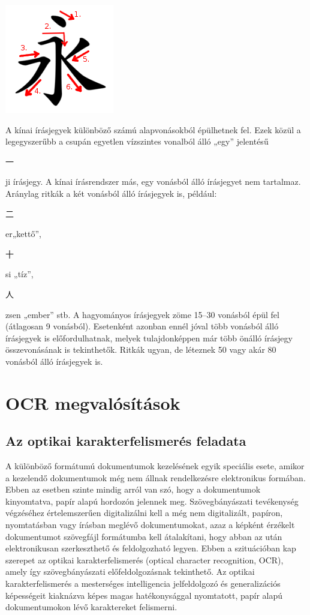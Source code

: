 \begin{center}
	\includegraphics[scale=1.0]{images/vonasrend_ordered.png}
\end{center}

A kínai írásjegyek különböző számú alapvonásokból épülhetnek fel. Ezek közül a legegyszerűbb a csupán egyetlen vízszintes vonalból álló „egy” jelentésű \begin{CJK*}{UTF8}{gbsn}
一
\end{CJK*} ji írásjegy. A kínai írásrendszer más, egy vonásból álló írásjegyet nem tartalmaz. Aránylag ritkák a két vonásból álló írásjegyek is, például: \begin{CJK*}{UTF8}{gbsn}
二
\end{CJK*} er„kettő”,
\begin{CJK*}{UTF8}{gbsn}
十
\end{CJK*} si „tíz”,
\begin{CJK*}{UTF8}{gbsn}
人
\end{CJK*} zsen „ember” stb. A hagyományos írásjegyek zöme 15–30 vonásból épül fel (átlagosan 9 vonásból). Esetenként azonban ennél jóval több vonásból álló írásjegyek is előfordulhatnak, melyek tulajdonképpen már több önálló írásjegy összevonásának is tekinthetők. Ritkák ugyan, de léteznek 50 vagy akár 80 vonásból álló írásjegyek is.

\section{OCR megvalósítások}

\subsection{Az optikai karakterfelismerés feladata}

A különböző formátumú dokumentumok kezelésének egyik speciális esete, amikor a kezelendő dokumentumok még nem állnak rendelkezésre elektronikus formában. Ebben az esetben szinte mindig arról van szó, hogy a dokumentumok kinyomtatva, papír alapú hordozón jelennek meg. Szövegbányászati tevékenység végzéséhez értelemszerűen digitalizálni kell a még nem digitalizált, papíron, nyomtatásban vagy írásban meglévő dokumentumokat, azaz a képként érzékelt dokumentumot szövegfájl formátumba kell átalakítani, hogy abban az után elektronikusan szerkeszthető és feldolgozható legyen. Ebben a szituációban kap szerepet az optikai karakterfelismerés (optical character recognition, OCR), amely így szövegbányászati előfeldolgozásnak tekinthető. Az optikai karakterfelismerés a mesterséges intelligencia jelfeldolgozó és generalizációs képességeit kiaknázva képes magas hatékonysággal nyomtatott, papír alapú dokumentumokon lévő karaktereket felismerni.

